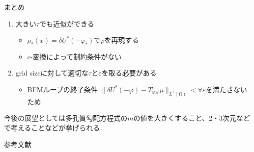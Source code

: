 \documentclass[dvipdfmx, 12pt]{beamer}
\begin{document}
\begin{frame}{まとめ}
    \begin{enumerate}
        \item 大きい$\tau$でも近似ができる
        \begin{itemize}
            \item $\rho_*(x) = \delta U^*(- \varphi_*)$で$\rho$を再現する
            \item $c$-変換によって制約条件がない        
        \end{itemize}
        \item grid sizeに対して適切な$\tau$と$\varepsilon$を取る必要がある
        \begin{itemize}
            \item BFMループの終了条件 $\|\delta U^*(- \varphi) - T_{\varphi \#} \mu \|_{L^1(\Omega)} <  \forall \varepsilon$を満たさないため
        \end{itemize}
    \end{enumerate}
    \vspace{\baselineskip} 

    今後の展望としては多孔質勾配方程式の$m$の値を大きくすること、2・3次元などで考えることなどが挙げられる
    
\end{frame}

\begin{frame}{参考文献}
    
\end{frame}
\end{document}
